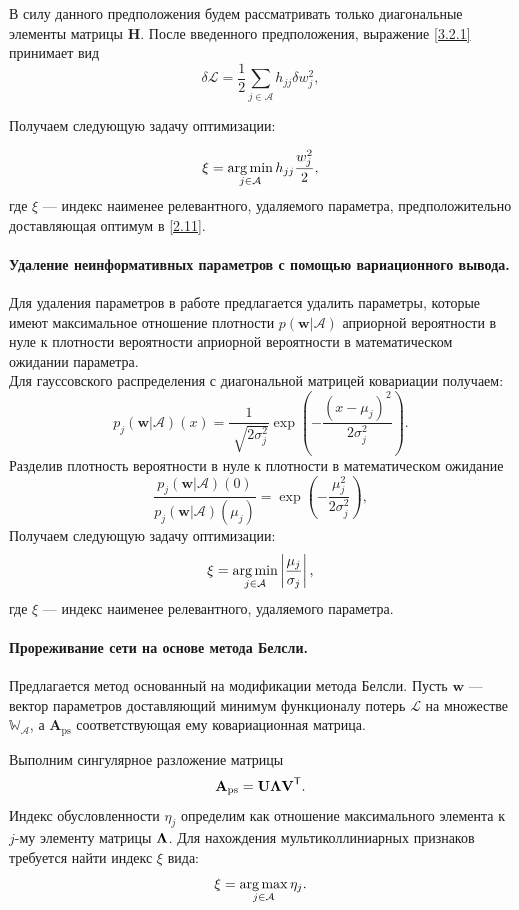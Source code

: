 В силу данного предположения будем рассматривать только диагональные элементы матрицы \textbf{H}. После введенного предположения, выражение \eqref{3.2.1} принимает вид
\[
\label{3.2.4}
\delta \mathcal{L} = \frac{1}{2} \sum_{j\in \mathcal{A}} h_{jj}\delta w_j^2, 
\]

Получаем следующую задачу оптимизации:

\[
\label{3.2.5}
\xi = \operatorname*{arg\,min}_{j\in \mathcal{A}} h_{jj}\frac{w_j^2}{2},
\]
где $\xi$ --- индекс наименее релевантного, удаляемого параметра, предположительно доставляющая оптимум в \eqref{2.11}.

\paragraph{Удаление неинформативных параметров с помощью вариационного вывода.}
Для удаления параметров в работе \cite{graves2011} предлагается удалить параметры, которые имеют максимальное отношение плотности $p(\textbf{w}|\mathcal{A})$ априорной вероятности в нуле к плотности вероятности априорной вероятности в математическом ожидании параметра.\\
Для гауссовского распределения с диагональной матрицей ковариации получаем:
\[
\label{3.3.1}
p_j(\textbf{w}|\mathcal{A})(x) = \frac{1}{\sqrt[]{2\sigma_j^2}}\exp({-\frac{(x-\mu_j)^2}{2\sigma_j^2}}).
\]
Разделив плотность вероятности в нуле к плотности в математическом ожидание
\[
\label{3.3.2}
\frac{p_j(\textbf{w}|\mathcal{A})(0)}{p_j(\textbf{w}|\mathcal{A})(\mu_j)}= \exp({-\frac{\mu_j^2}{2\sigma_j^2}}),
\]
Получаем следующую задачу оптимизации:
\[
\label{3.3.3}
\xi = \operatorname*{arg\,min}_{j\in \mathcal{A}} \left|\frac{\mu_j}{\sigma_j}\right|,
\]
где $\xi$ --- индекс наименее релевантного, удаляемого параметра.

\paragraph{Прореживание сети на основе метода Белсли.}
Предлагается метод основанный на модификации метода Белсли. Пусть $\textbf{w}$ --- вектор параметров доставляющий минимум функционалу потерь $\mathcal{L}$ на  множестве $\mathbb{W_\mathcal{A}}$, а $\textbf{A}_\text{ps}$ соответствующая ему ковариационная матрица.

Выполним сингулярное разложение матрицы
\[
\label{4.1}
\textbf{A}_\text{ps} = \textbf{U}{\bf\Lambda}\textbf{V}^\mathsf{T}.
\]
Индекс обусловленности $\eta_{j}$ определим как отношение максимального элемента к $j$-му элементу матрицы ${\bf\Lambda}$. Для нахождения мультиколлиниарных признаков требуется найти индекс $\xi$ вида:
\[
\label{4.2}
\xi = \operatorname*{arg\,max}_{j\in \mathcal{A}}{\eta_j}.
\]

